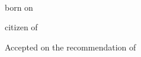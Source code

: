 {\begin{titlepage}
		\vspace{0.8cm}
		
    \begin{center}
      \large \acatitlestring \\[1.5ex]

				\vspace{0.8cm}

       born on \dateofbirthstring \\[1.5ex]

		\vspace{0.2cm}

      citizen of \citizenstring
    \end{center}

		\vspace{2.0cm}

    \begin{center}
      \large Accepted on the recommendation of \\[1.5ex]
      \examinerstring \\[1.5ex] \coexaminerstring
    \end{center}

		\vspace{2.0cm}


    \begin{center}
      \large\datestring
    \end{center}
		\endgroup
    \if@twoside
      \newpage
      \thispagestyle{empty}
    \fi
		\restoregeometry
  \end{titlepage}
}
